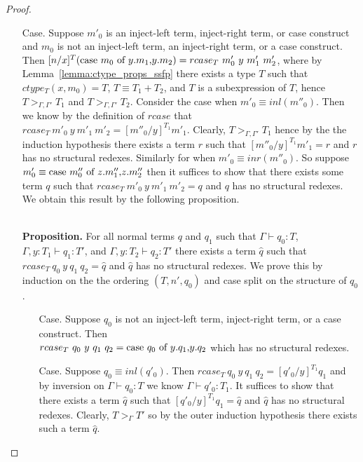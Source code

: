 \begin{proof}
\begin{itemize}
\begin{itemize}
  \item[Case.] Suppose $m'_0$ is an inject-left term, inject-right term, or case construct and $m_0$ is not
    an inject-left term, an inject-right term, or a case construct.  Then
    $[n/x]^{T} (\mbox{case}\ m_0\ \text{of}\ y\text{.}m_1\text{,}y\text{.}m_2) = rcase_{T}\ m'_0\ y\ m'_1\ m'_2$, where by \\
    Lemma~\ref{lemma:ctype_props_ssfp}
    there exists a type $T$ such that $ctype_T(x,m_0) = T$, $T \equiv T_1+T_2$, and $T$ is a subexpression
    of $T$, hence $T >_{\Gamma,\Gamma'} T_1$ and $T >_{\Gamma,\Gamma'} T_2$.
    Consider the case when $m'_0 \equiv inl(m''_0)$.  Then we know by the definition of $rcase$ that
    $rcase_{T}\ m'_0\ y\ m'_1\ m'_2 = [m''_0/y]^{T_1} m'_1$.  Clearly, $T >_{\Gamma,\Gamma'} T_1$ hence
    by the the induction hypothesis there exists a term $r$ such that $[m''_0/y]^{T_1} m'_1 = r$ and
    $r$ has no structural redexes. Similarly for when $m'_0 \equiv inr(m''_0)$.  
    So suppose $m'_0 \equiv \mbox{case}\ m''_0\ \text{of}\ z\text{.}m''_1\text{,}z\text{.}m''_2$ then it suffices to show that there exists some term
    $q$ such that $rcase_{T}\ m'_0\ y\ m'_1\ m'_2 = q$ and $q$ has no structural redexes.  We obtain this
    result by the following proposition.
      
    \ \\
    {\bf Proposition.} For all normal terms $q$ and $q_1$ such that 
    $\Gamma \vdash q_0:T$, $\Gamma, y:T_1 \vdash q_1:T'$, 
    and $\Gamma, y:T_2 \vdash q_2:T'$ there exists a term $\hat{q}$ such that 
    $rcase_{T}\ q_0\ y\ q_1\ q_2 = \hat{q}$ and $\hat{q}$ has no structural redexes.
    We prove this by induction on the the ordering $(T, n', q_0)$ and case split on the structure of $q_0$.
    \begin{itemize}
    \item[Case.] Suppose $q_0$ is not an inject-left term, inject-right term, or a case construct.  Then\\
      $rcase_{T}\ q_0\ y\ q_1\ q_2 = \mbox{case}\ q_0\ \text{of}\ y\text{.}q_1\text{,}y\text{.}q_2$ which has no structural redexes.
      
    \item[Case.] Suppose $q_0 \equiv inl(q'_0)$.  Then $rcase_{T}\ q_0\ y\ q_1\ q_2 = [q'_0/y]^{T_1} q_1$ and
      by inversion on $\Gamma \vdash q_0:T$ we know $\Gamma \vdash q'_0:T_1$.  It suffices to show that there
      exists a term $\hat{q}$ such that $[q'_0/y]^{T_1} q_1 = \hat{q}$  and $\hat{q}$ has no structural redexes.
      Clearly, $T >_{\Gamma} T'$ so by the outer induction hypothesis there exists such a term $\hat{q}$.
      

\end{itemize}
\end{itemize}
\end{itemize}
\end{proof}
